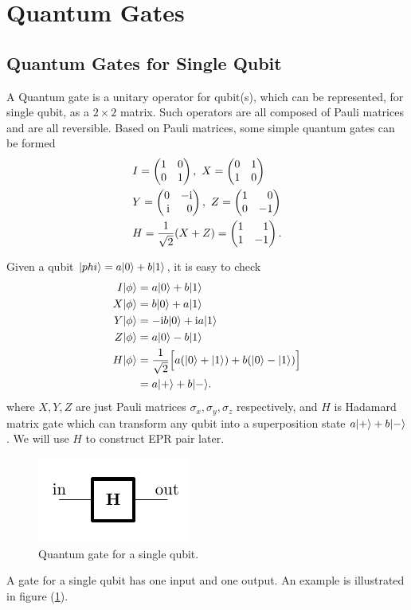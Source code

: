 \section{Quantum Gates}
	\subsection{Quantum Gates for Single Qubit}
		A Quantum gate is a unitary operator for qubit(s), which can be represented, for single qubit, as a $2\times 2$ matrix. Such operators are all composed of Pauli matrices and are all reversible. Based on Pauli matrices, some simple quantum gates can be formed
		\begin{equation}
		\begin{split}
		&I = \I,\  
		 X = \X \\
		&Y = \Y,\ 
		 Z = \Z\\
		&H = \Had.
		\end{split}
		\end{equation}

		Given a qubit $|{phi} \rangle = a|{0} \rangle + b|{1} \rangle$, it is easy to check
		\begin{align}
		I |{\phi} \rangle &= a|{0} \rangle + b|{1} \rangle \\
		X |{\phi} \rangle &= b|{0} \rangle + a|{1} \rangle\\
		Y |{\phi} \rangle &= -\mathrm{i} b|{0} \rangle + \mathrm{i} a|{1} \rangle\\
		Z |{\phi} \rangle &= a|{0} \rangle - b|{1} \rangle\\
		H |{\phi} \rangle &= \frac{1}{\sqrt{2}} \Bigl[ a(|{0} \rangle+|{1} \rangle)+b(|{0} \rangle-|{1} \rangle) \Bigr] \notag \\
		&= a |{+} \rangle+b|{-} \rangle.
		\end{align}
		where $X,Y,Z$ are just Pauli matrices $\sigma_x,\sigma_y,\sigma_z$ respectively, and $H$ is Hadamard\cite{art:Hardamard} matrix gate which can transform any qubit into a superposition state $a |{+} \rangle+b|{-} \rangle$. We will use $H$ to construct EPR pair later.
		\begin{figure}[H]
		\centering
		\includegraphics[scale=1.2]{img/singleGate-1.pdf}
		\caption{Quantum gate for a single qubit.}
		\label{img:1qubitGate}
		\end{figure}
		A gate for a single qubit has one input and one output. 
		An example is illustrated in figure (\ref{img:1qubitGate}).

